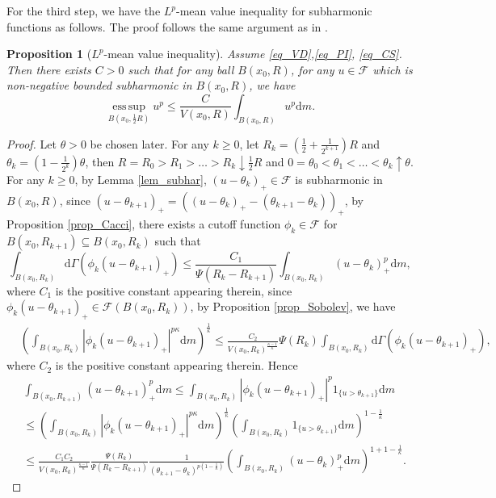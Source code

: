 \documentclass[11pt,a4paper]{article}
\numberwithin{equation}{section}
\newcommand{\esup}{\operatorname*{ess\,sup}}
\theoremstyle{plain}
\newtheorem{proposition}[theorem]{Proposition}
\theoremstyle{definition}
\begin{document}
For the third step, we have the $L^p$-mean value inequality for subharmonic functions as follows. The proof follows the same argument as in \cite[THEOREM 6.2]{GHL15}.

\begin{proposition}[$L^p$-mean value inequality]\label{prop_MV}
Assume \ref{eq_VD},\ref{eq_PI}, \ref{eq_CS}. Then there exists $C>0$ such that for any ball $B(x_0,R)$, for any $u\in\mathcal{F}$ which is non-negative bounded subharmonic in $B(x_0,R)$, we have
$$\esup_{B(x_0,\frac{1}{2}R)}u^p\le \frac{C}{V(x_0,R)}\int_{B(x_0,R)}u^p\mathrm{d} m.$$
\end{proposition}

\begin{proof}
Let $\theta>0$ be chosen later. For any $k\ge0$, let $R_k=\left(\frac{1}{2}+\frac{1}{2^{k+1}}\right)R$ and $\theta_k=(1-\frac{1}{2^k})\theta$, then $R=R_0>R_1>\ldots>R_k\downarrow \frac{1}{2}R$ and $0=\theta_0<\theta_1<\ldots<\theta_k\uparrow\theta$. For any $k\ge0$, by Lemma \ref{lem_subhar}, $(u-\theta_k)_+\in\mathcal{F}$ is subharmonic in $B(x_0,R)$, since $(u-\theta_{k+1})_+=((u-\theta_k)_+-(\theta_{k+1}-\theta_k))_+$, by Proposition \ref{prop_Cacci}, there exists a cutoff function $\phi_k\in\mathcal{F}$ for $B(x_0,R_{k+1})\subseteq B(x_0,R_k)$ such that
$$\int_{B(x_0,R_k)}\mathrm{d}\Gamma(\phi_k(u-\theta_{k+1})_+)\le \frac{C_1}{\Psi(R_k-R_{k+1})}\int_{B(x_0,R_k)}(u-\theta_k)_+^p\mathrm{d} m,$$
where $C_1$ is the positive constant appearing therein, since $\phi_k(u-\theta_{k+1})_+\in\mathcal{F}(B(x_0,R_k))$, by Proposition \ref{prop_Sobolev}, we have
\begin{align*}
&\left(\int_{B(x_0,R_k)}|\phi_k(u-\theta_{k+1})_+|^{p\kappa}\mathrm{d} m\right)^{\frac{1}{\kappa}}\le\frac{C_2}{V(x_0,R_k)^{\frac{\kappa-1}{\kappa}}}\Psi(R_k)\int_{B(x_0,R_k)}\mathrm{d}\Gamma(\phi_k(u-\theta_{k+1})_+),
\end{align*}
where $C_2$ is the positive constant appearing therein. Hence
\begin{align*}
&\int_{B(x_0,R_{k+1})}(u-\theta_{k+1})_+^p\mathrm{d} m\le\int_{B(x_0,R_k)}|\phi_k(u-\theta_{k+1})_+|^{p}1_{\{u>\theta_{k+1}\}}\mathrm{d} m\\
&\le\left(\int_{B(x_0,R_k)}|\phi_k(u-\theta_{k+1})_+|^{p\kappa}\mathrm{d} m\right)^{\frac{1}{\kappa}}\left(\int_{B(x_0,R_k)}1_{\{u>\theta_{k+1}\}}\mathrm{d} m\right)^{1-\frac{1}{\kappa}}\\
&\le \frac{C_1C_2}{V(x_0,R_k)^{\frac{\kappa-1}{\kappa}}}\frac{\Psi(R_k)}{\Psi(R_k-R_{k+1})}\frac{1}{(\theta_{k+1}-\theta_k)^{p(1-\frac{1}{\kappa})}}\left(\int_{B(x_0,R_k)}(u-\theta_k)_+^p\mathrm{d} m\right)^{1+1-\frac{1}{\kappa}}.

\end{align*}
\end{proof}
\end{document}
